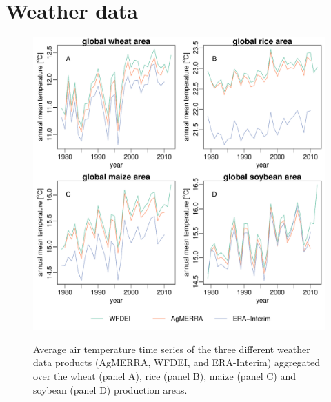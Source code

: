\documentclass[10pt]{article}
\begin{document}
\section{Weather data}
\begin{figure}[h!]
\includegraphics[width=\textwidth]{temperatures_4crops_totalarea.pdf}\\
\caption{Average air temperature time series of the three different weather data products (AgMERRA, WFDEI, and ERA-Interim) aggregated over the wheat (panel A), rice (panel B), maize (panel C) and soybean (panel D) production areas.}
\label{fig:temperatures}
\end{figure}
\end{document}
